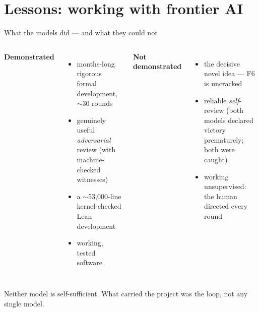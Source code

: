 \documentclass[aspectratio=169,11pt]{beamer}
\begin{document}
\section{Lessons: working with frontier AI}
\begin{frame}{What the models did --- and what they could not}
\begin{columns}[T]
\textbf{\textcolor{good}{Demonstrated}}
\begin{itemize}
  \item months-long rigorous formal development, $\sim$30 rounds
  \item genuinely useful \emph{adversarial} review (with machine-checked witnesses)
  \item a $\sim$53{,}000-line kernel-checked Lean development
  \item working, tested software
\end{itemize}
\textbf{\textcolor{openc}{Not demonstrated}}
\begin{itemize}
  \item the \alert{decisive novel idea} --- F6 is uncracked
  \item reliable \emph{self}-review (both models declared victory prematurely; both were caught)
  \item working unsupervised: the human directed every round
\end{itemize}
\end{columns}
\vfill
\begin{center}
Neither model is self-sufficient. \alert{What carried the project was the loop, not any single model.}
\end{center}
\end{frame}
\end{document}
